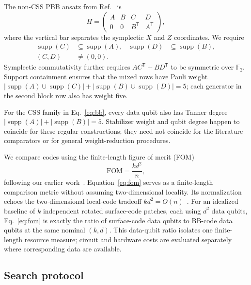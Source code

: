 \documentclass[aps,prx,twocolumn,superscriptaddress,nofootinbib,floatfix]{revtex4-2}
\newcommand{\FF}{\ensuremath{\mathbb{F}}}
\newcommand{\FOM}{\ensuremath{\mathrm{FOM}}}
\newcommand{\supp}{\ensuremath{\operatorname{supp}}}
\begin{document}
The non-CSS PBB ansatz from Ref.~\cite{cruzbenito2026evolutionary} is
\begin{equation}
H=\left(\begin{array}{cc|cc}
A&B&C&D\\
0&0&B^\mathsf{T}&A^\mathsf{T}
\end{array}\right),
\label{eq:pbb}
\end{equation}
where the vertical bar separates the symplectic $X$ and $Z$ coordinates.  We
require
\begin{equation}
\begin{aligned}
\supp(C)&\subseteq\supp(A), &
\supp(D)&\subseteq\supp(B),\\
(C,D)&\neq(0,0).
\end{aligned}
\end{equation}
Symplectic commutativity further requires
$AC^\mathsf{T}+BD^\mathsf{T}$ to be symmetric over $\FF_2$.  Support
containment ensures that the mixed rows have Pauli weight
$|\supp(A)\cup\supp(C)|+|\supp(B)\cup\supp(D)|=5$; each generator in the
second block row also has weight five.

For the CSS family in Eq.~\eqref{eq:bb}, every data qubit also has Tanner
degree $|\supp(A)|+|\supp(B)|=5$.  Stabilizer weight and qubit degree happen
to coincide for these regular constructions; they need not coincide for the
literature comparators or for general weight-reduction procedures.

We compare codes using the finite-length figure of merit (FOM)
\begin{equation}
\FOM=\frac{k d^2}{n},
\label{eq:fom}
\end{equation}
following our earlier work~\cite{cruzbenito2026evolutionary}.
Equation~\eqref{eq:fom} serves as a finite-length comparison metric without assuming
two-dimensional locality.  Its normalization echoes the two-dimensional
local-code tradeoff $kd^2=O(n)$~\cite{bravyi2010tradeoffs}.
For an idealized baseline of $k$ independent rotated surface-code patches,
each using $d^2$ data qubits, Eq.~\eqref{eq:fom} is exactly the ratio of
surface-code data qubits to BB-code data qubits at the same nominal $(k,d)$.
This data-qubit ratio isolates one finite-length resource measure; circuit and
hardware costs are evaluated separately where corresponding data are
available.

\subsection{Search protocol}
\end{document}
